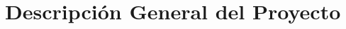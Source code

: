 \newcommand{\novathesis}{\emph{novathesis}}
\newcommand{\novathesisclass}{\texttt{novathesis.cls}}


\chapter{Descripción General del Proyecto}
\label{cha:Descripción General del Proyecto}




%
%
%

